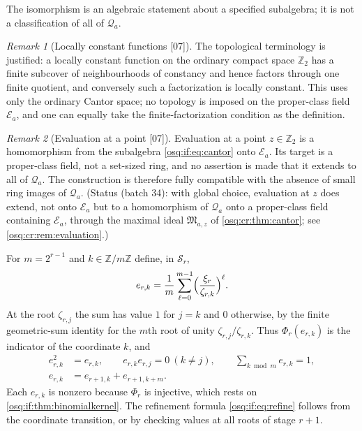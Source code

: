 \documentclass[11pt,letterpaper]{article}
\numberwithin{equation}{section}
\theoremstyle{definition}
\theoremstyle{remark}
\newtheorem{remark}[remark]{Remark}
\theoremstyle{plain}
\newcommand{\Z}{\mathbb Z}
\newcommand{\EE}{\mathscr E}         %
\newcommand{\Qa}{\mathcal Q}         %
\newcommand{\src}[1]{\textup{\textsf{[#1]}}}
\begin{document}
The isomorphism is an algebraic statement about a specified subalgebra; it is not a
classification of all of $\Qa_a$.

\begin{remark}[Locally constant functions \src{07}]\label{osq:if:rem:lc}
The topological terminology is justified: a locally constant function on the ordinary
compact space $\Z_2$ has a finite subcover of neighbourhoods of constancy and hence factors
through one finite quotient, and conversely such a factorization is locally constant. This
uses only the ordinary Cantor space; no topology is imposed on the proper-class field
$\EE_a$, and one can equally take the finite-factorization condition as the definition.
\end{remark}

\begin{remark}[Evaluation at a point \src{07}]\label{osq:if:rem:evaluation}
Evaluation at a point $z\in\Z_2$ is a homomorphism from the subalgebra
\eqref{osq:if:eq:cantor} onto $\EE_a$. Its target is a proper-class field, not a set-sized
ring, and no assertion is made that it extends to all of $\Qa_a$. The construction is
therefore fully compatible with the absence of small ring images of $\Qa_a$. (Status (batch 34): with global choice, evaluation at $z$ does
extend, not onto $\EE_a$ but to a homomorphism of $\Qa_a$ onto a proper-class field containing $\EE_a$, through the maximal ideal $\mathfrak M_{a,z}$ of
\cref{osq:cr:thm:cantor}; see \cref{osq:cr:rem:evaluation}.)
\end{remark}

For $m=2^{r-1}$ and $k\in\Z/m\Z$ define, in $\mathcal S_r$,
\begin{equation}\label{osq:if:eq:idempotent}
 e_{r,k}=\frac1m\sum_{\ell=0}^{m-1}\Bigl(\frac{\xi_r}{\zeta_{r,k}}\Bigr)^{\ell}.
\end{equation}
At the root $\zeta_{r,j}$ the sum has value $1$ for $j=k$ and $0$ otherwise, by the finite
geometric-sum identity for the $m$th root of unity $\zeta_{r,j}/\zeta_{r,k}$. Thus
$\Phi_r(e_{r,k})$ is the indicator of the coordinate $k$, and
\begin{align}
 e_{r,k}^2&=e_{r,k},\qquad e_{r,k}e_{r,j}=0\ (k\ne j),\qquad
 \sum_{k\bmod m}e_{r,k}=1,\label{osq:if:eq:idempotentlaws}\\
 e_{r,k}&=e_{r+1,k}+e_{r+1,k+m}.\label{osq:if:eq:refine}
\end{align}
Each $e_{r,k}$ is nonzero because $\Phi_r$ is injective, which rests on
\cref{osq:if:thm:binomialkernel}. The refinement formula \eqref{osq:if:eq:refine} follows
from the coordinate transition, or by checking values at all roots of stage $r+1$.
\end{document}
